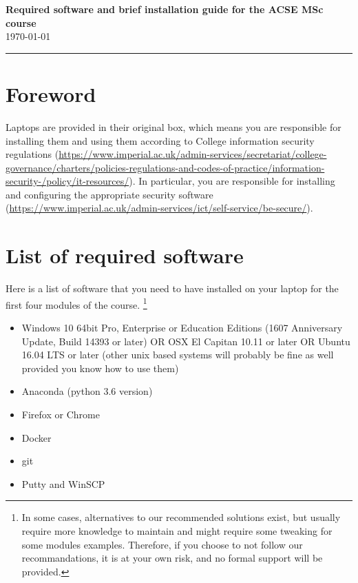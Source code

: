 \documentclass[11pt]{article}
\begin{document}
\begin{center}
{\bf \Large Required software and brief installation guide for the ACSE MSc course } \\ \today
\end{center}
\hrule
\vspace*{1cm}


\section{Foreword}

Laptops are provided in their original box, which means you are responsible for installing them and using them according to College information security regulations (\url{https://www.imperial.ac.uk/admin-services/secretariat/college-governance/charters/policies-regulations-and-codes-of-practice/information-security-/policy/it-resources/}). 
In particular, you are responsible for installing and configuring the appropriate security software (\url{https://www.imperial.ac.uk/admin-services/ict/self-service/be-secure/}).


\section{List of required software}

Here is a list of  software that you need to have installed on your laptop for the first four modules of the course.
\footnote{In some cases, alternatives to our recommended solutions exist, but usually require more knowledge to maintain and might require some tweaking for some modules examples. 
Therefore, if you choose to not follow our recommandations, it is at your own risk, and no formal support will be provided.}

\begin{itemize}
  \item Windows 10  64bit Pro, Enterprise or Education Editions (1607 Anniversary Update, Build 14393 or later) OR OSX  El Capitan 10.11 or later OR Ubuntu 16.04 LTS or later (other unix based systems will probably be fine as well provided you know how to use them)
  \item Anaconda (python 3.6 version)
  \item Firefox or Chrome
  \item Docker
  \item git
  \item Putty and WinSCP
\end{itemize}
\end{document}
